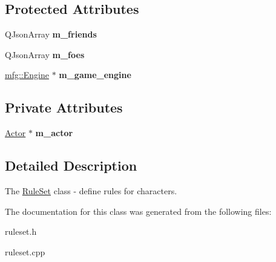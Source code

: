 \subsection*{Protected Attributes}
\begin{DoxyCompactItemize}
\item 
\mbox{\label{class_rule_set_ad6f6ce80af76542f89bc4a9557708b4a}} 
Q\+Json\+Array {\bfseries m\+\_\+friends}
\item 
\mbox{\label{class_rule_set_a604539c01fc13d94ee8242e484d21a50}} 
Q\+Json\+Array {\bfseries m\+\_\+foes}
\item 
\mbox{\label{class_rule_set_adeb1310cc1a39af21ca3ce37f99e332e}} 
\hyperlink{classmfg_1_1_engine}{mfg\+::\+Engine} $\ast$ {\bfseries m\+\_\+game\+\_\+engine}
\end{DoxyCompactItemize}
\subsection*{Private Attributes}
\begin{DoxyCompactItemize}
\item 
\mbox{\label{class_rule_set_ae91eb402b95d7fc606fa514b2feec0ce}} 
\hyperlink{class_actor}{Actor} $\ast$ {\bfseries m\+\_\+actor}
\end{DoxyCompactItemize}


\subsection{Detailed Description}
The \hyperlink{class_rule_set}{Rule\+Set} class -\/ define rules for characters. 

The documentation for this class was generated from the following files\+:\begin{DoxyCompactItemize}
\item 
ruleset.\+h\item 
ruleset.\+cpp\end{DoxyCompactItemize}
